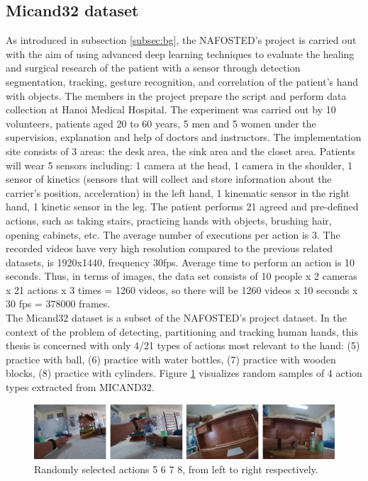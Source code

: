 \subsection{Micand32 dataset} \label{subsec:micand32}
As introduced in subsection \ref{subsec:bg}, the NAFOSTED’s project is carried out with the aim of using advanced deep learning techniques to evaluate the healing and surgical research of the patient with a sensor through detection segmentation, tracking, gesture recognition, and correlation of the patient's hand with objects. The members in the project prepare the script and perform data collection at Hanoi Medical Hospital. The experiment was carried out by 10 volunteers, patients aged 20 to 60 years, 5 men and 5 women under the supervision, explanation and help of doctors and instructors. The implementation site consists of 3 areas: the desk area, the sink area and the closet area. Patients will wear 5 sensors including: 1 camera at the head, 1 camera in the shoulder, 1 sensor of kinetics (sensors that will collect and store information about the carrier's position, acceleration) in the left hand, 1 kinematic sensor in the right hand, 1 kinetic sensor in the leg. The patient performs 21 agreed and pre-defined actions, such as taking stairs, practicing hands with objects, brushing hair, opening cabinets, etc. The average number of executions per action is 3. The recorded videos have very high resolution compared to the previous related datasets, is 1920x1440, frequency 30fps. Average time to perform an action is 10 seconds. Thus, in terms of images, the data set consists of 10 people x 2 cameras x 21 actions x 3 times = 1260 videos, so there will be 1260 videos x 10 seconds x 30 fps = 378000 frames.
\\The Micand32 dataset is a subset of the NAFOSTED's project dataset. In the context of the problem of detecting, partitioning and tracking human hands, this thesis is concerned with only 4/21 types of actions most relevant to the hand: (5) practice with ball, (6) practice with water bottles, (7) practice with wooden blocks, (8) practice with cylinders. Figure \ref{fig:micand32} visualizes random samples of 4 action types extracted from MICAND32.
\begin{figure}
	\centerline{\includegraphics[width=1\linewidth]{Figs/micand32.png}}
	\caption{Randomly selected actions 5 6 7 8, from left to right respectively.}
	\label{fig:micand32}
\end{figure}

